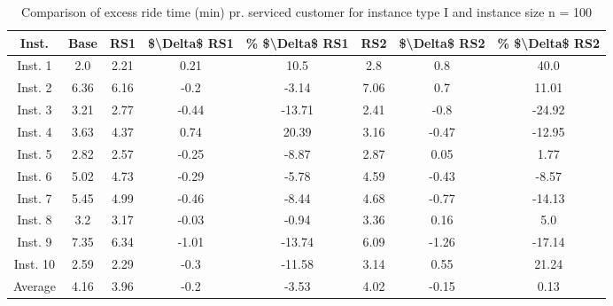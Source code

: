 \begin{table}[H]
\centering
\begin{tabular}{cccccccc}
  \hline
  \textbf{Inst.} & \textbf{Base} & \textbf{RS1} & \textbf{\$\textbackslash{}Delta\$  RS1} & \textbf{\% \$\textbackslash{}Delta\$  RS1} & \textbf{RS2} & \textbf{\$\textbackslash{}Delta\$  RS2} & \textbf{\% \$\textbackslash{}Delta\$  RS2} \\\hline
  Inst. 1 & 2.0 & 2.21 & 0.21 & 10.5 & 2.8 & 0.8 & 40.0 \\
  Inst. 2 & 6.36 & 6.16 & -0.2 & -3.14 & 7.06 & 0.7 & 11.01 \\
  Inst. 3 & 3.21 & 2.77 & -0.44 & -13.71 & 2.41 & -0.8 & -24.92 \\
  Inst. 4 & 3.63 & 4.37 & 0.74 & 20.39 & 3.16 & -0.47 & -12.95 \\
  Inst. 5 & 2.82 & 2.57 & -0.25 & -8.87 & 2.87 & 0.05 & 1.77 \\
  Inst. 6 & 5.02 & 4.73 & -0.29 & -5.78 & 4.59 & -0.43 & -8.57 \\
  Inst. 7 & 5.45 & 4.99 & -0.46 & -8.44 & 4.68 & -0.77 & -14.13 \\
  Inst. 8 & 3.2 & 3.17 & -0.03 & -0.94 & 3.36 & 0.16 & 5.0 \\
  Inst. 9 & 7.35 & 6.34 & -1.01 & -13.74 & 6.09 & -1.26 & -17.14 \\
  Inst. 10 & 2.59 & 2.29 & -0.3 & -11.58 & 3.14 & 0.55 & 21.24 \\
  Average & 4.16 & 3.96 & -0.2 & -3.53 & 4.02 & -0.15 & 0.13 \\\hline
\end{tabular}
\caption{Comparison of excess ride time (min) pr. serviced customer for instance type I and instance size n = 100}
\label{tab:wait:resrelocation-excess-ride-time-comparison_I_100}
\end{table}
